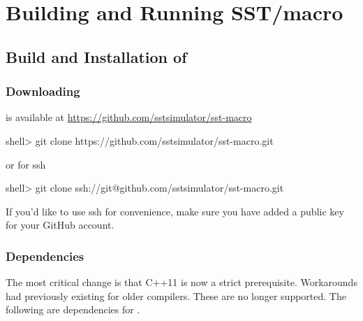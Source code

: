 
\chapter{Building and Running SST/macro}
\label{chapter:building}

\section{Build and Installation of \sstmacro}
\label{sec:buildinstall}


\subsection{Downloading}
\label{subsec:build:downloading}

\sstmacro is available at \url{https://github.com/sstsimulator/sst-macro}

\begin{ShellCmd}
shell> git clone https://github.com/sstsimulator/sst-macro.git 
\end{ShellCmd}
or for ssh

\begin{ShellCmd}
shell> git clone ssh://git@github.com/sstsimulator/sst-macro.git 
\end{ShellCmd}


If you'd like to use ssh for convenience, make sure you have added a public key for your GitHub account.

\subsection{Dependencies}
\label{subsec:build:dependencies}
The most critical change is that C++11 is now a strict prerequisite. 
Workarounds had previously existing for older compilers. 
These are no longer supported.
The following are dependencies for \sstmacro.

